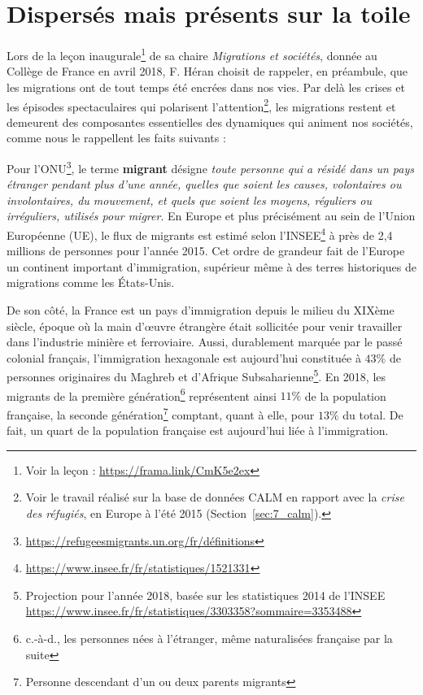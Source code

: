 \documentclass[symmetric,justified,marginals=raggedouter]{tufte-book}
\begin{document}
\section{Dispersés mais présents sur la toile}
\label{sec:2_migrant}

\noindent Lors de la leçon inaugurale\footnote{\RaggedOuter Voir la leçon : \url{https://frama.link/CmK5e2ex}} de sa chaire \textit{Migrations et sociétés}, donnée au Collège de France en avril 2018, F. Héran choisit de rappeler, en préambule, que les migrations ont de tout temps été encrées dans nos vies. Par delà les crises et les épisodes spectaculaires qui polarisent l'attention\footnote{\RaggedOuter Voir le travail réalisé sur la base de données CALM en rapport avec la \textit{crise des réfugiés}, en Europe à l'été 2015 (Section~\ref{sec:7_calm}).}, les migrations restent et demeurent des composantes essentielles des dynamiques qui animent nos sociétés, comme nous le rappellent les faits suivants : 

Pour l'ONU\footnote{\RaggedOuter \url{https://refugeesmigrants.un.org/fr/définitions}}, le terme \textbf{migrant} désigne \og\textit{toute personne qui a résidé dans un pays étranger pendant plus d'une année, quelles que soient les causes, volontaires ou involontaires, du mouvement, et quels que soient les moyens, réguliers ou irréguliers, utilisés pour migrer}\fg{}. En Europe et plus précisément au sein de l'Union Européenne (UE), le flux de migrants est estimé selon l'INSEE\footnote{\RaggedOuter \url{https://www.insee.fr/fr/statistiques/1521331}} à près de 2,4 millions de personnes pour l'année 2015. Cet ordre de grandeur fait de l'Europe un continent important d'immigration, supérieur même à des terres historiques de migrations comme les États-Unis. 

De son côté, la France est un pays d'immigration depuis le milieu du XIXème siècle, époque où la main d'œuvre étrangère était sollicitée pour venir travailler dans l'industrie minière et ferroviaire. Aussi, durablement marquée par le passé colonial français, l'immigration hexagonale est aujourd'hui constituée à $43\%$ de personnes originaires du Maghreb et d'Afrique Subsaharienne\footnote{\RaggedOuter Projection pour l'année 2018, basée sur les statistiques 2014 de l'INSEE  \url{https://www.insee.fr/fr/statistiques/3303358?sommaire=3353488}}. En 2018, les migrants de la première génération\footnote{\RaggedOuter c.-à-d., les personnes nées à l'étranger, même naturalisées française par la suite} représentent ainsi $11\%$ de la population française, la seconde génération\footnote{\RaggedOuter Personne descendant d'un ou deux parents migrants} comptant, quant à elle, pour $13\%$ du total. De fait, un quart de la population française est aujourd'hui liée à l'immigration.
\end{document}
